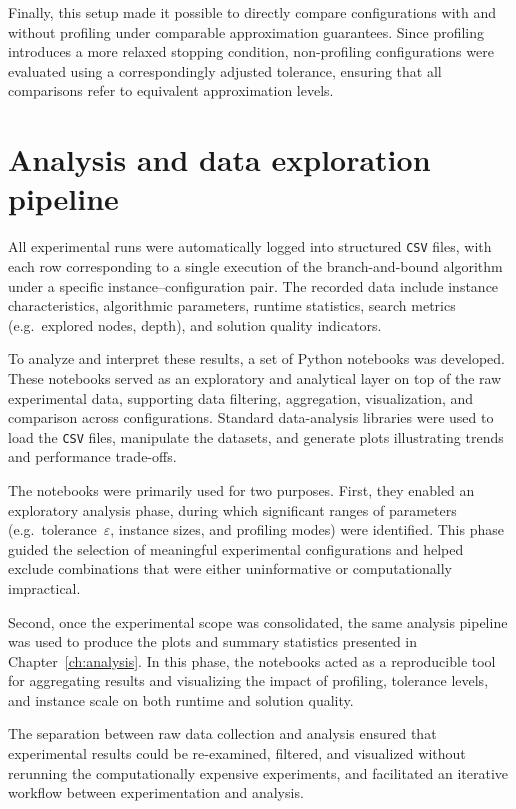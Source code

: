 Finally, this setup made it possible to directly compare configurations with and without profiling under comparable approximation guarantees.
Since profiling introduces a more relaxed stopping condition, non-profiling configurations were evaluated using a correspondingly adjusted tolerance, ensuring that all comparisons refer to equivalent approximation levels.

\section{Analysis and data exploration pipeline}
\label{subsec:analysis-pipeline}

All experimental runs were automatically logged into structured \texttt{CSV} files, with each row corresponding to a single execution of the branch-and-bound algorithm under a specific instance--configuration pair.
The recorded data include instance characteristics, algorithmic parameters, runtime statistics, search metrics (e.g.\ explored nodes, depth), and solution quality indicators.

To analyze and interpret these results, a set of Python notebooks was developed.
These notebooks served as an exploratory and analytical layer on top of the raw experimental data, supporting data filtering, aggregation, visualization, and comparison across configurations.
Standard data-analysis libraries were used to load the \texttt{CSV} files, manipulate the datasets, and generate plots illustrating trends and performance trade-offs.

The notebooks were primarily used for two purposes.
First, they enabled an exploratory analysis phase, during which significant ranges of parameters (e.g.\ tolerance~\(\varepsilon\), instance sizes, and profiling modes) were identified.
This phase guided the selection of meaningful experimental configurations and helped exclude combinations that were either uninformative or computationally impractical.

Second, once the experimental scope was consolidated, the same analysis pipeline was used to produce the plots and summary statistics presented in Chapter~\ref{ch:analysis}.
In this phase, the notebooks acted as a reproducible tool for aggregating results and visualizing the impact of profiling, tolerance levels, and instance scale on both runtime and solution quality.

The separation between raw data collection and analysis ensured that experimental results could be re-examined, filtered, and visualized without rerunning the computationally expensive experiments, and facilitated an iterative workflow between experimentation and analysis.
